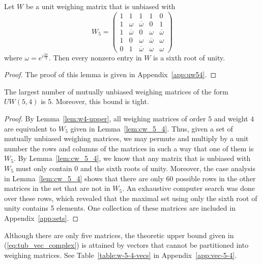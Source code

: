 \begin{lemma}\label{lem:cw_5_4}
 Let $W$ be a unit weighing matrix that is unbiased with 
$$
W_5 = \left(
\begin{array}{ccccc}
 1 & 1            &1            &1            &0 \\
 1 & \omega            &\overline{\omega} &0            &1 \\
 1 & \overline{\omega} &0            &\omega            &\overline{\omega} \\
 1 & 0            &\omega            &\overline{\omega} &\omega \\
 0 & 1            &\overline{\omega} &\omega            &\omega
\end{array}
\right)
$$
where $\omega = e^{i\frac{2\pi}{3}}$. Then every nonzero entry in $W$ is a sixth root of unity.

 \begin{proof}
  The proof of this lemma is given in Appendix~\ref{app:uw54}.
 \end{proof}
\end{lemma}

\begin{theorem} \label{th:cw_5_4}
 The largest number of mutually unbiased weighing matrices of the form $UW(5,4)$ is 5. Moreover, this bound is tight.
 \begin{proof}
  By Lemma~\ref{lem:w4-upper}, all weighing matrices of order $5$ and weight $4$ are equivalent to $W_5$ given in Lemma~\ref{lem:cw_5_4}. Thus, given a set of mutually unbiased weighing matrices, we may permute and multiply by a unit number the rows and columns of the matrices in such a way that one of them is $W_5$. By Lemma~\ref{lem:cw_5_4}, we know that any matrix that is unbiased with $W_5$ must only contain 0 and the sixth roots of unity. Moreover, the case analysis in Lemma~\ref{lem:cw_5_4} shows that there are only 60 possible rows in the other matrices in the set that are not in $W_5$. An exhaustive computer search was done over these rows, which revealed that the maximal set using only the sixth root of unity contains 5 elements. One collection of these matrices are included in Appendix~\ref{app:sets}.
 \end{proof}
\end{theorem}

Although there are only five matrices, the theoretic upper bound given in (\ref{eq:tub_vec_complex}) is attained by vectors that cannot be partitioned into weighing matrices. See Table~\ref{table:w-5-4-vecs} in Appendix~\ref{app:vec-5-4}.


